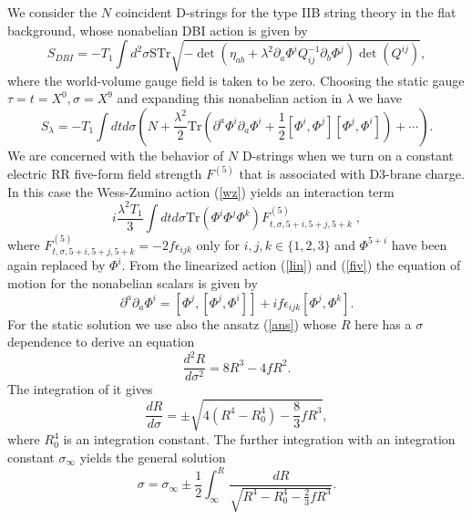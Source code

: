 \documentclass[12pt,a4paper]{article}
\newcommand{\la}{\lambda}
\begin{document}
We consider the $N$ coincident D-strings for the type IIB string theory in
the flat background, whose nonabelian DBI action is given by
\begin{equation}
S_{DBI} = - T_1 \int d^2\sigma \mathrm{STr} \sqrt{-\det (\eta_{ab} + 
\la^2\partial_a\Phi^iQ^{-1}_{ij}\partial_b\Phi^j)\det(Q^{ij})},
\label{dst}\end{equation}
where the world-volume gauge field is taken to be zero. Choosing the 
static gauge $\tau = t =X^0, \sigma =X^9$ and expanding this nonabelian
action in $\la$ we have
\begin{equation}
S_{\la} = -T_1 \int dtd\sigma ( N + \frac{\la^2}{2}\mathrm{Tr}
(\partial^a\Phi^i\partial_a\Phi^i + \frac{1}{2}[\Phi^i,\Phi^j]
[\Phi^j,\Phi^i]) + \cdots ).
\label{lin}\end{equation}
We are concerned with the behavior of $N$ D-strings when we turn on a 
constant electric RR five-form field strength $F^{(5)}$ that is associated
with D3-brane charge. In this case the Wess-Zumino action (\ref{wz}) 
yields an interaction term
\begin{equation}
i\frac{\la^2T_1}{3}\int dtd\sigma \mathrm{Tr}(\Phi^i\Phi^j\Phi^k)
F^{(5)}_{t,\sigma,5+i,5+j,5+k}\; ,
\label{fiv}\end{equation}
where $F^{(5)}_{t,\sigma,5+i,5+j,5+k}
 = -2f\epsilon_{ijk}$ only for $i,j,k \in \{1,2,3\}$ and
$\Phi^{5+i}$ have been again replaced by $\Phi^i$. From 
the linearized action (\ref{lin}) and 
(\ref{fiv}) the equation of motion for the nonabelian scalars is given by
\begin{equation}
\partial^a\partial_a \Phi^i = [\Phi^j,[\Phi^j,\Phi^i]] + 
if\epsilon_{ijk}[\Phi^j,\Phi^k].
\end{equation}
For the static solution we use also the ansatz (\ref{ans}) whose $R$ here
has a $\sigma$ dependence to derive an equation
\begin{equation}
\frac{d^2R}{d\sigma^2} = 8R^3 - 4fR^2.
\end{equation}
The integration of it gives
\begin{equation}
\frac{dR}{d\sigma} = \pm \sqrt{4(R^4 - R_0^4) - \frac{8}{3}fR^3},
\label{dif}\end{equation}
where $R_0^4$ is an integration constant. The further integration with an
integration constant $\sigma_{\infty}$ yields the general solution
\begin{equation}
\sigma = \sigma_{\infty} \pm \frac{1}{2}\int_{\infty}^{R} \frac{dR}
{\sqrt{R^4-R_0^4 - \frac{2}{3}fR^3}}.
\label{ges}\end{equation}
\end{document}
